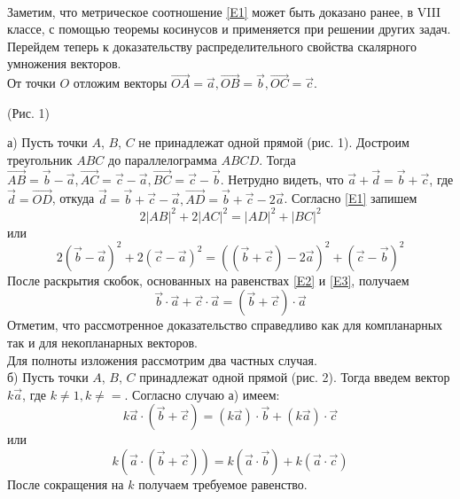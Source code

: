 \documentclass{article}
\begin{document}
\\Заметим, что метрическое соотношение \eqref{E1} может быть доказано ранее, в VIII классе, с помощью теоремы косинусов и применяется при решении других задач.
\\Перейдем теперь к доказательству распределительного свойства скалярного умножения векторов.
\\От точки $O$ отложим векторы $\overrightarrow{OA}=\overrightarrow{a},\overrightarrow{OB}=\overrightarrow{b},\overrightarrow{OC}=\overrightarrow{c}$.
\\
%
%
%
%
\begin{center}
(Рис. 1)
\end{center}
а) Пусть точки $A$, $B$, $C$ не принадлежат одной прямой (рис. 1). Достроим треугольник $ABC$ до параллелограмма $ABCD$. Тогда $\overrightarrow{AB}=\overrightarrow{b}-\overrightarrow{a}, \overrightarrow{AC}=\overrightarrow{c}-\overrightarrow{a}, \overrightarrow{BC}=\overrightarrow{c}-\overrightarrow{b}$. Нетрудно видеть, что $\overrightarrow{a}+\overrightarrow{d}=\overrightarrow{b}+\overrightarrow{c}$, где $\overrightarrow{d}=\overrightarrow{OD}$, откуда $\overrightarrow{d}=\overrightarrow{b}+\overrightarrow{c}-\overrightarrow{a}, \overrightarrow{AD}=\overrightarrow{b}+\overrightarrow{c}-2\overrightarrow{a}$. Согласно \eqref{E1} запишем
$$2|AB|^2+2|AC|^2=|AD|^2+|BC|^2$$
или
$$2(\overrightarrow{b}-\overrightarrow{a})^2+2(\overrightarrow{c}-\overrightarrow{a})^2=((\overrightarrow{b}+\overrightarrow{c})-2\overrightarrow{a})^2+(\overrightarrow{c}-\overrightarrow{b})^2$$
После раскрытия скобок, основанных на равенствах \eqref{E2} и \eqref{E3}, получаем
$$\overrightarrow{b}\cdot\overrightarrow{a}+\overrightarrow{c}\cdot\overrightarrow{a}=(\overrightarrow{b}+\overrightarrow{c})\cdot\overrightarrow{a}$$
Отметим, что рассмотренное доказательство справедливо как для компланарных так и для некопланарных векторов.
\\Для полноты изложения рассмотрим два частных случая.
\\б) Пусть точки $A$, $B$, $C$ принадлежат одной прямой (рис. 2). Тогда введем вектор $k\overrightarrow{a}$, где $k\neq1,k\neq=$. Согласно случаю а) имеем:
$$k\overrightarrow{a}\cdot(\overrightarrow{b}+\overrightarrow{c})=(k\overrightarrow{a})\cdot\overrightarrow{b}+(k\overrightarrow{a})\cdot\overrightarrow{c}$$
или
$$k(\overrightarrow{a}\cdot(\overrightarrow{b}+\overrightarrow{c}))=k(\overrightarrow{a}\cdot\overrightarrow{b})+k(\overrightarrow{a}\cdot\overrightarrow{c})$$
После сокращения на $k$ получаем требуемое равенство.
\\
\end{document}
